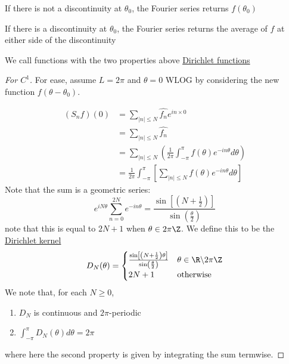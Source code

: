 \documentclass[../Main.tex]{subfiles}
\begin{document}
\begin{remarks}
    \item If there is not a discontinuity at $\theta_0$, the Fourier series returns $f(\theta_0)$
    \item If there is a discontinuity at $\theta_0$, the Fourier series returns the average of $f$ at either side of the discontinuity
    \item We call functions with the two properties above \underline{Dirichlet functions}
\end{remarks}
\begin{proof}[For $C^1$]
    For ease, assume $L = 2\pi$ and $\theta = 0$ WLOG by considering the new function $f(\theta - \theta_0)$.

    \begin{align*}
        (S_n f)(0) &= \sum_{|n| \leq N} \hat{f_n} e^{in \times 0} \\
        &= \sum_{|n| \leq N} \hat{f_n} \\
        &= \sum_{|n| \leq N} \left(\frac{1}{2\pi} \int_{-\pi}^\pi f(\theta) e^{-i n \theta} d\theta\right) \\
        &=\frac1{2\pi} \int_{-\pi}^\pi \left[\sum_{|n| \leq N} f(\theta) e^{-i n \theta}d\theta\right]
    \end{align*}
    Note that the sum is a geometric series:
    \begin{equation*}
        e^{iN\theta} \sum_{n = 0}^{2N} e^{-in\theta} = \frac{\sin\left[\left(N + \frac12\right)\right]}{\sin\left(\frac\theta{2}\right)}
    \end{equation*}
    note that this is equal to $2N + 1$ when $\theta \in 2\pi\Z$. We define this to be the \underline{Dirichlet kernel}
    \begin{equation*}
        D_N(\theta) =
        \begin{cases}
            \frac{\sin\left[\left(N + \frac12\right)\theta\right]}{\sin\left(\frac{\theta}{2}\right)} & \theta \in \R \backslash 2\pi \Z \\
            2N + 1 & \text{otherwise}
        \end{cases}
    \end{equation*}
    We note that, for each $N \geq 0$,
    \begin{enumerate}
        \item $D_N$ is continuous and $2\pi$-periodic
        \item $\int_{-\pi}^\pi D_N(\theta) d\theta = 2\pi$
    \end{enumerate}
    where here the second property is given by integrating the sum termwise.


\end{proof}
\end{document}
